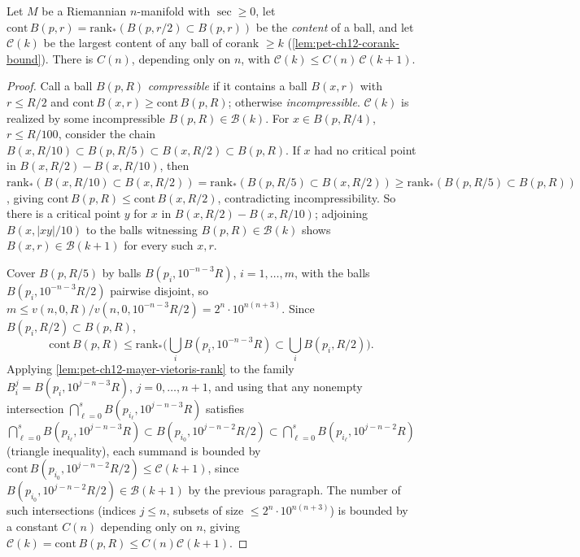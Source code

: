 \begin{lemma}
  \label{lem:pet-ch12-content-ratio-bound}
  Let $M$ be a Riemannian $n$-manifold with $\sec\ge0$, let
  $\mathrm{cont}\,B(p,r)=\mathrm{rank}_*(B(p,r/2)\subset B(p,r))$ be the
  \emph{content} of a ball, and let $\mathcal{C}(k)$ be the largest content of
  any ball of corank $\ge k$ (\cref{lem:pet-ch12-corank-bound}). There is
  $C(n)$, depending only on $n$, with $\mathcal{C}(k)\le
  C(n)\,\mathcal{C}(k+1)$.
\end{lemma}
\begin{proof}
  Call a ball $B(p,R)$ \emph{compressible} if it contains a ball $B(x,r)$ with
  $r\le R/2$ and $\mathrm{cont}\,B(x,r)\ge\mathrm{cont}\,B(p,R)$; otherwise
  \emph{incompressible}. $\mathcal{C}(k)$ is realized by some incompressible
  $B(p,R)\in\mathcal{B}(k)$. For $x\in B(p,R/4)$, $r\le R/100$, consider the
  chain $B(x,R/10)\subset B(p,R/5)\subset B(x,R/2)\subset B(p,R)$. If $x$ had no
  critical point in $B(x,R/2)-B(x,R/10)$, then
  $\mathrm{rank}_*(B(x,R/10)\subset B(x,R/2))=\mathrm{rank}_*(B(p,R/5)\subset
  B(x,R/2))\ge\mathrm{rank}_*(B(p,R/5)\subset B(p,R))$, giving
  $\mathrm{cont}\,B(p,R)\le\mathrm{cont}\,B(x,R/2)$, contradicting
  incompressibility. So there is a critical point $y$ for $x$ in
  $B(x,R/2)-B(x,R/10)$; adjoining $B(x,|xy|/10)$ to the balls witnessing
  $B(p,R)\in\mathcal{B}(k)$ shows $B(x,r)\in\mathcal{B}(k+1)$ for every such $x,r$.

  Cover $B(p,R/5)$ by balls $B(p_i,10^{-n-3}R)$, $i=1,\dots,m$, with the balls
  $B(p_i,10^{-n-3}R/2)$ pairwise disjoint, so
  $m\le v(n,0,R)/v(n,0,10^{-n-3}R/2)=2^n\cdot10^{n(n+3)}$. Since
  $B(p_i,R/2)\subset B(p,R)$,
  \[
    \mathrm{cont}\,B(p,R)\le\mathrm{rank}_*\Big(\bigcup_iB(p_i,10^{-n-3}R)\subset\bigcup_iB(p_i,R/2)\Big).
  \]
  Applying \cref{lem:pet-ch12-mayer-vietoris-rank} to the family
  $B_i^j=B(p_i,10^{j-n-3}R)$, $j=0,\dots,n+1$, and using that any nonempty
  intersection $\bigcap_{\ell=0}^sB(p_{i_\ell},10^{j-n-3}R)$ satisfies
  $\bigcap_{\ell=0}^sB(p_{i_\ell},10^{j-n-3}R)\subset
  B(p_{i_0},10^{j-n-2}R/2)\subset\bigcap_{\ell=0}^sB(p_{i_\ell},10^{j-n-2}R)$
  (triangle inequality), each summand is bounded by
  $\mathrm{cont}\,B(p_{i_0},10^{j-n-2}R/2)\le\mathcal{C}(k+1)$, since
  $B(p_{i_0},10^{j-n-2}R/2)\in\mathcal{B}(k+1)$ by the previous paragraph. The
  number of such intersections (indices $j\le n$, subsets of size
  $\le2^n\cdot10^{n(n+3)}$) is bounded by a constant $C(n)$ depending only on
  $n$, giving $\mathcal{C}(k)=\mathrm{cont}\,B(p,R)\le C(n)\mathcal{C}(k+1)$.
\end{proof}

